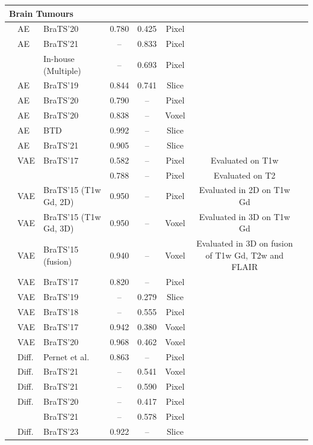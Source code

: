 \begin{longtable}{lp{1.2cm}lccccp{4.5cm}}
\multicolumn{7}{l}{\textbf{Brain Tumours}} \\
\midrule
\citet{Ghorbel2023} & AE & BraTS'20 & 0.780 & 0.425 & Pixel & \\
\citet{Kascenas2023} & AE & BraTS'21 & -- & 0.833 & Pixel & \\
 & & In-house (Multiple) & -- & 0.693 & Pixel & \\
\citet{Luo2023} & AE & BraTS'19 & 0.844 & 0.741 & Slice & \\
\citet{Meissen2023} & AE & BraTS'20 & 0.790 & -- & Pixel & \\
\citet{Jimenez-Garcia2024} & AE & BraTS'20 & 0.838 & -- & Voxel & \\
\citet{Lu2024} & AE & BTD & 0.992 & -- & Slice &\\
\citet{Qu2026} & AE & BraTS'21 & 0.905 & -- & Slice & \\
\citet{Sato2019} & VAE & BraTS'17 & 0.582 & -- & Pixel & Evaluated on T1w\\
 & & & 0.788 & -- & Pixel & Evaluated on T2\\
\citet{Uzunova2019} & VAE & BraTS'15 (T1w Gd, 2D) & 0.950 & -- & Pixel & Evaluated in 2D on T1w Gd\\
\citet{Uzunova2019} & VAE & BraTS'15 (T1w Gd, 3D) & 0.950 & -- & Voxel & Evaluated in 3D on T1w Gd}\\
\citet{Uzunova2019} & VAE & BraTS'15 (fusion) & 0.940 & -- & Voxel & Evaluated in 3D on fusion of T1w Gd, T2w and FLAIR}\\
\citet{Zimmerer2019} & VAE & BraTS'17 & 0.820 & -- & Pixel & \\
\citet{Bengs2021} & VAE & BraTS'19 & -- & 0.279 & Slice & \\
\citet{Pinaya2022-2} & VAE & BraTS'18 & -- & 0.555 & Pixel & \\
\citet{Lüth2023} & VAE &  BraTS'17 & 0.942 & 0.380 & Voxel & \\
\citet{Wijanarko2024} & VAE & BraTS'20 & 0.968 & 0.462 & Voxel & \\
\citet{Wyatt2022} & Diff. & Pernet et al. & 0.863 & -- & Pixel & \\
\citet{Behrendt2023} & Diff. & BraTS'21 & -- & 0.541 & Voxel & \\
\citet{Iqbal2023} & Diff. & BraTS'21 & -- & 0.590 & Pixel & \\
\citet{Kumar2024} & Diff. & BraTS'20 & -- & 0.417 & Pixel & \\
 & & BraTS'21 & -- & 0.578 & Pixel & \\
\citet{Bi2025} & Diff. & BraTS'23 & 0.922 & -- & Slice & \\
\hline


\end{longtable}
